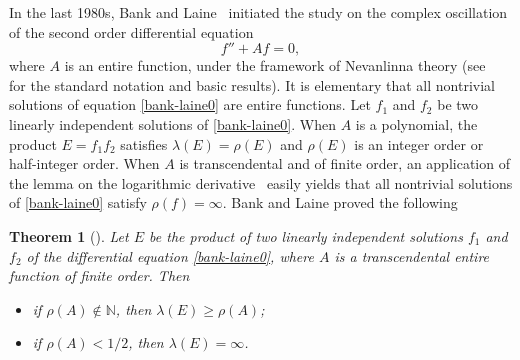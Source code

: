 \documentclass[12pt]{amsart}
\numberwithin{equation}{section}
\newtheorem{theorem}{Theorem}[section]
\begin{document}
In the last 1980s, Bank and Laine~\cite{Banklaine1982,Banklaine1982-2} initiated the study on the complex oscillation of the second order differential equation
\begin{equation}\label{bank-laine0}
f''+Af=0,
\end{equation}
where $A$ is an entire function, under the framework of Nevanlinna theory (see~\cite{Hayman1964Meromorphic} for the standard notation and basic results).
It is elementary that all nontrivial solutions of equation \eqref{bank-laine0} are entire functions. Let $f_1$ and $f_2$ be two linearly independent solutions of \eqref{bank-laine0}. When $A$ is a polynomial, the product $E=f_1f_2$ satisfies $\lambda(E)=\rho(E)$ and $\rho(E)$ is an integer order or half-integer order. When $A$ is transcendental and of finite order, an application of the lemma on the logarithmic derivative~\cite[Section~2.2]{Hayman1964Meromorphic} easily yields that all nontrivial solutions of \eqref{bank-laine0} satisfy $\rho(f)=\infty$. Bank and Laine proved the following

\begin{theorem}[\cite{Banklaine1982,Banklaine1982-2}]\label{maintheorem1}
Let $E$ be the product of two linearly independent solutions $f_1$ and $f_2$ of the differential equation \eqref{bank-laine0}, where $A$ is a transcendental entire function of finite order. Then
\begin{itemize}
  \item [(1)] if $\rho(A)\not\in \mathbb{N}$, then $\lambda(E) \geq \rho(A)$;
  \item [(2)] if $\rho(A)<1/2$, then $\lambda(E)=\infty$.
\end{itemize}

\end{theorem}
\end{document}
